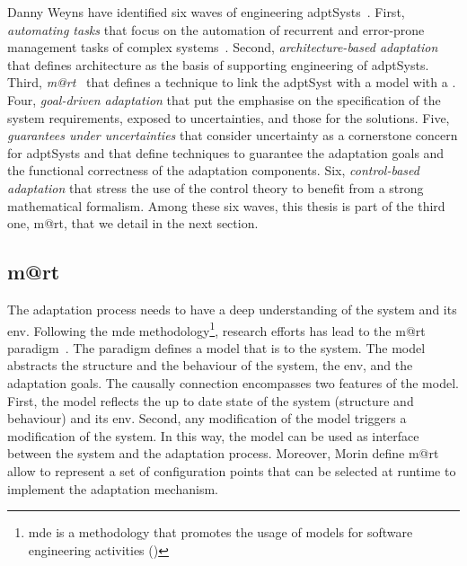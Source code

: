 Danny Weyns have identified six waves of engineering \glspl{adptSyst}~\cite{DBLP:books/sp/19/Weyns19}.
First, \textit{automating tasks} that focus on the automation of recurrent and error-prone management tasks of complex systems~\cite{DBLP:journals/computer/KephartC03}.
Second, \textit{architecture-based adaptation} that defines architecture as the basis of supporting engineering of \glspl{adptSyst}. 
Third, \textit{\gls{m@rt}}~\cite{DBLP:journals/computer/BlairBF09, DBLP:journals/computer/MorinBJFS09} that defines a technique to link the \gls{adptSyst} with a model with a .
Four, \textit{goal-driven adaptation} that put the emphasise on the specification of the system requirements, exposed to uncertainties, and those for the solutions.
Five, \textit{guarantees under uncertainties} that consider uncertainty as a cornerstone concern for \glspl{adptSyst} and that define techniques to guarantee the adaptation goals and the functional correctness of the adaptation components.
Six, \textit{control-based adaptation} that stress the use of the control theory to benefit from a strong mathematical formalism.
Among these six waves, this thesis is part of the third one, \gls{m@rt}, that we detail in the next section.


\subsection[Models@run.time]{\Gls{m@rt}}
The adaptation process needs to have a deep understanding of the system and its \gls{env}.
Following the \gls{mde} methodology\footnote{\gls{mde} is a methodology that promotes the usage of \glspl{model} for software engineering activities (\cf {})}, research efforts has lead to the \gls{m@rt} paradigm~\cite{DBLP:journals/computer/MorinBJFS09, DBLP:journals/computer/BlairBF09}.
The paradigm defines a \gls{model} that is  to the system.
The \gls{model} abstracts the structure and the behaviour of the system, the \gls{env}, and the adaptation goals.
The causally connection encompasses two features of the \gls{model}.
First, the model reflects the up to date state of the system (structure and behaviour) and its \gls{env}.
Second, any modification of the model triggers a modification of the system.
In this way, the \gls{model} can be used as interface between the system and the adaptation process.
Moreover, Morin \etal \cite{DBLP:journals/computer/MorinBJFS09} define \gls{m@rt} allow to represent a set of configuration points that can be selected at runtime to implement the adaptation mechanism.

